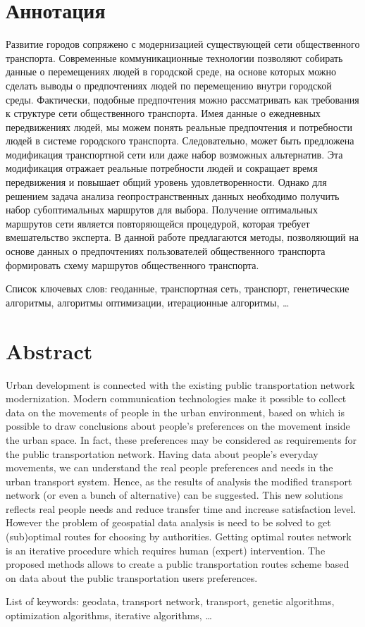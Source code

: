 \tocless\part{Аннотация}
Развитие городов сопряжено с модернизацией существующей сети общественного транспорта. Современные 
коммуникационные технологии позволяют собирать данные о перемещениях людей в городской среде, на основе 
которых можно сделать выводы о предпочтениях людей по перемещению внутри городской среды. Фактически, 
подобные предпочтения можно рассматривать как требования к структуре сети общественного транспорта. 
Имея данные о ежедневных передвижениях людей, мы можем понять реальные предпочтения и потребности людей 
в системе городского транспорта. Следовательно, может быть предложена модификация транспортной сети или 
даже набор возможных альтернатив. Эта модификация отражает реальные потребности людей и сокращает время 
передвижения и повышает общий уровень удовлетворенности. Однако для решением задача анализа 
геопространственных данных необходимо получить набор субоптимальных маршрутов для выбора. Получение 
оптимальных маршрутов сети является повторяющейся процедурой, которая требует вмешательство эксперта.
В данной работе предлагаются методы, позволяющий на основе данных о предпочтениях пользователей 
общественного транспорта формировать схему маршрутов общественного транспорта.

Список ключевых слов: геоданные, транспортная сеть, транспорт, генетические алгоритмы, 
алгоритмы оптимизации, итерационные алгоритмы, \ldots

\tocless\part{Abstract}
Urban development is connected with the existing public transportation network modernization. Modern 
communication technologies make it possible to collect data on the movements of people in the urban 
environment, based on which is possible to draw conclusions about people's preferences on the movement 
inside the urban space. In fact, these preferences may be considered as requirements for the public 
transportation network. Having data about people's everyday movements, we can understand the real 
people preferences and needs in the urban transport system. Hence, as the results of analysis the 
modified transport network (or even a bunch of alternative) can be suggested. This new solutions reflects 
real people needs and reduce transfer time and increase satisfaction level. However the problem of 
geospatial data analysis is need to be solved to get (sub)optimal routes for choosing by authorities. 
Getting optimal routes network is an iterative procedure which requires human (expert) intervention.
The proposed methods allows to create a public transportation routes scheme based on data about the 
public transportation users preferences.

List of keywords: geodata, transport network, transport, genetic algorithms, optimization algorithms,
iterative algorithms, \ldots